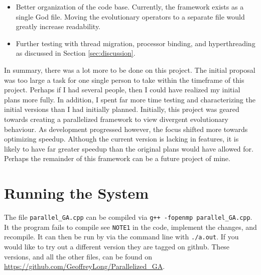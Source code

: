 \documentclass[10pt,letterpaper]{article}
\begin{document}
\begin{itemize}
\item Better organization of the code base. Currently, the framework exists as a single God file. Moving the evolutionary operators to a separate file would greatly increase readability.
\item Further testing with thread migration, processor binding, and hyperthreading as discussed in Section \ref{sec:discussion}.
\end{itemize}

\newpage
In summary, there was a lot more to be done on this project. The initial proposal was too large a task for one single person to take within the timeframe of this project. Perhaps if I had several people, then I could have realized my initial plans more fully. In addition, I spent far more time testing and characterizing the initial versions than I had initially planned. Initially, this project was geared towards creating a parallelized framework to view divergent evolutionary behaviour. As development progressed however, the focus shifted more towards optimizing speedup. Although the current version is lacking in features, it is likely to have far greater speedup than the original plans would have allowed for. Perhaps the remainder of this framework can be a future project of mine.

\section{Running the System}
The file \texttt{parallel\_GA.cpp} can be compiled via \texttt{g++ -fopenmp parallel\_GA.cpp}. It the program fails to compile see \texttt{NOTE1} in the code, implement the changes, and recompile. It can then be run by via the command line with \texttt{./a.out}. If you would like to try out a different version they are tagged on github. These versions, and all the other files, can be found on \url{https://github.com/GeoffreyLong/Parallelized_GA}.
\end{document}
